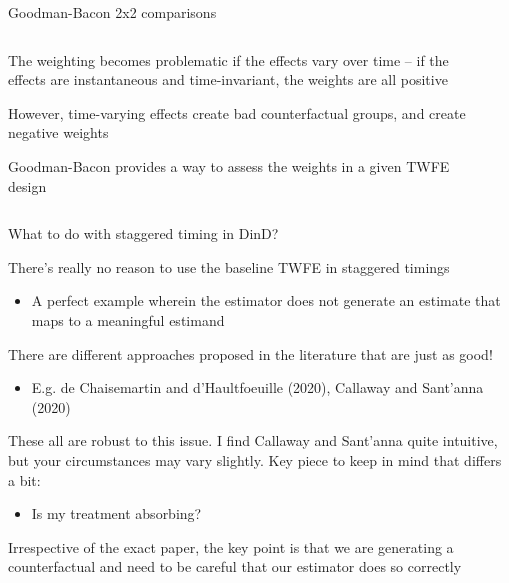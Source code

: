 \documentclass[notes,11pt, aspectratio=169]{beamer}
\newenvironment{wideitemize}{\itemize\addtolength{\itemsep}{10pt}}{\enditemize}
\begin{document}
\begin{frame}{Goodman-Bacon 2x2 comparisons}
  \begin{columns}[T] %
    \begin{column}{0.4\textwidth}
      \begin{wideitemize}
      \item<1-> The weighting becomes problematic if the effects vary
        over time -- if the effects are instantaneous and
        time-invariant, the weights are all positive
      \item<2-> However, time-varying effects create bad
        counterfactual groups, and create negative weights
      \item<2-> Goodman-Bacon provides a way to assess the weights in
        a given TWFE design
      \end{wideitemize}
    \end{column}%
    \hfill%
    \begin{column}{.6\textwidth}
    \end{column}%
  \end{columns}
\end{frame}


\begin{frame}{What to do with staggered timing in DinD?}
  \begin{wideitemize}
  \item There's really no reason to use the baseline TWFE in staggered timings
    \begin{itemize}
    \item A perfect example wherein the estimator does not generate an
      estimate that maps to a meaningful estimand
    \end{itemize}
  \item There are different approaches proposed in the literature that are just as good! 
    \begin{itemize}
    \item E.g. de Chaisemartin and  d'Haultfoeuille (2020), Callaway and Sant'anna (2020)      
    \end{itemize}
  \item These all are robust to this issue. I find Callaway and
    Sant'anna quite intuitive, but your circumstances may vary
    slightly. Key piece to keep in mind that differs a bit: 
    \begin{itemize}
    \item Is my treatment absorbing?
    \end{itemize}
  \item Irrespective of the exact paper, the key point is that we are
    generating a counterfactual and need to be careful that our
    estimator does so correctly
  \end{wideitemize}
\end{frame}
\end{document}
